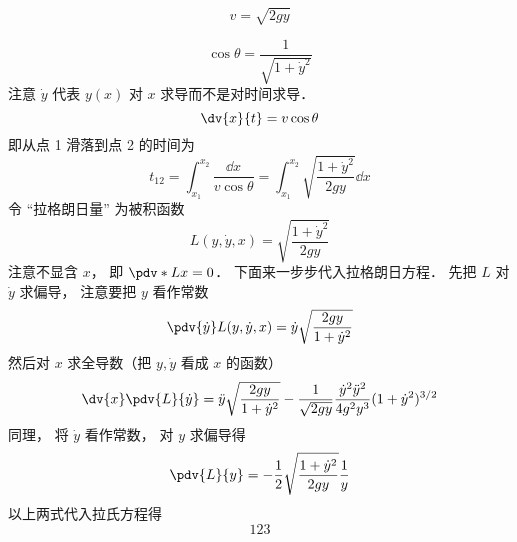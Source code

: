 

\begin{equation}
v = \sqrt{2gy}
\end{equation}

\begin{equation}
\cos\theta = \frac{1}{\sqrt{1 + \dot{y}^2}}
\end{equation}
注意 $\dot{y}$ 代表 $y(x)$ 对 $x$ 求导而不是对时间求导．
\begin{equation}
\dv{x}{t} = v\cos\theta
\end{equation}
即从点 1 滑落到点 2 的时间为
\begin{equation}
t_{12} = \int_{x_1}^{x_2} \frac{\dd{x}}{v\cos\theta} = \int_{x_1}^{x_2} \sqrt{\frac{1 + \dot{y}^2}{2gy}} \dd{x}
\end{equation}
令 “拉格朗日量” 为被积函数
\begin{equation}
L(y, \dot y, x) = \sqrt{\frac{1 + \dot{y}^2}{2gy}}
\end{equation}
注意不显含 $x$， 即 $\pdv*{L}{x} = 0$． 下面来一步步代入拉格朗日方程． 先把 $L$ 对 $\dot{y}$ 求偏导， 注意要把 $y$ 看作常数
\begin{equation}
\pdv{\dot{y}}L(y, \dot{y}, x) = \dot y\sqrt{\frac{2gy}{1+\dot{y}^2}}
\end{equation}
然后对 $x$ 求全导数（把 $y, \dot{y}$ 看成 $x$ 的函数）
\begin{equation}
\dv{x}\pdv{L}{\dot{y}} = \ddot{y}\sqrt{\frac{2gy}{1+\dot{y}^2}} - \frac{1}{\sqrt{2gy}}\frac{\dot{y}^2\ddot{y}^2}{4g^2y^3}(1+\dot{y}^2)^{3/2}
\end{equation}
同理， 将 $\dot y$ 看作常数， 对 $y$ 求偏导得
\begin{equation}
\pdv{L}{y} = -\frac{1}{2} \sqrt{\frac{1 + \dot{y}^2}{2gy}} \frac{1}{y}
\end{equation}
以上两式代入拉氏方程得
\begin{equation}
123
\end{equation}
